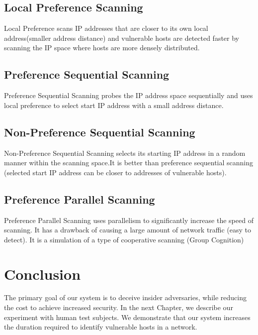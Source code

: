 \subsection{Local Preference Scanning}
Local Preference scans IP addresses that are closer to its own local address(smaller address distance) and vulnerable hosts are detected faster by scanning the IP space where hosts are more densely distributed.
\subsection{Preference Sequential Scanning}
Preference Sequential Scanning probes the IP address space sequentially and uses local preference to select start IP address with a small address distance.
\subsection{Non-Preference Sequential Scanning}
Non-Preference Sequential Scanning selects its starting IP address in a random manner within the scanning space.It is better than preference sequential scanning (selected start IP address can be closer to addresses of vulnerable hosts).
\subsection{Preference Parallel Scanning}
Preference Parallel Scanning uses parallelism to significantly
increase the speed of scanning. It has a drawback of causing a large amount of network traffic (easy to detect). It is a simulation of a type of cooperative scanning (Group Cognition)
\section{Conclusion}
The primary goal of our system is to deceive insider adversaries, while reducing the cost to achieve increased security. In the next Chapter, we describe our experiment with human test subjects. We demonstrate that our system increases the duration required to identify vulnerable hosts in a network.

\clearpage 
